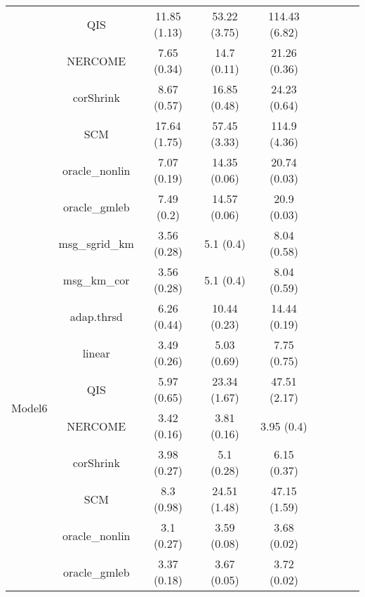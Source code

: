 \documentclass[useAMS,referee,usenatbib]{biom}
\begin{document}
\begin{table}[H]
{\begin{tabular}{ccccccccc}
 & QIS            & 11.85 (1.13) & 53.22 (3.75) & 114.43 (6.82) \\
 & NERCOME        & 7.65 (0.34)  & 14.7 (0.11)  & 21.26 (0.36)  \\
 & corShrink      & 8.67 (0.57)  & 16.85 (0.48) & 24.23 (0.64)  \\
 & SCM            & 17.64 (1.75) & 57.45 (3.33) & 114.9 (4.36)  \\
 & oracle\_nonlin & 7.07 (0.19)  & 14.35 (0.06) & 20.74 (0.03)  \\
 & oracle\_gmleb  & 7.49 (0.2)   & 14.57 (0.06) & 20.9 (0.03)   \\  \midrule
\multirow{10}{*}{Model6}  
 & msg\_sgrid\_km & 3.56 (0.28) & 5.1 (0.4)    & 8.04 (0.58)  \\
 & msg\_km\_cor   & 3.56 (0.28) & 5.1 (0.4)    & 8.04 (0.59)  \\
 & adap.thrsd     & 6.26 (0.44) & 10.44 (0.23) & 14.44 (0.19) \\
 & linear         & 3.49 (0.26) & 5.03 (0.69)  & 7.75 (0.75)  \\
 & QIS            & 5.97 (0.65) & 23.34 (1.67) & 47.51 (2.17) \\
 & NERCOME        & 3.42 (0.16) & 3.81 (0.16)  & 3.95 (0.4)   \\
 & corShrink      & 3.98 (0.27) & 5.1 (0.28)   & 6.15 (0.37)  \\
 & SCM            & 8.3 (0.98)  & 24.51 (1.48) & 47.15 (1.59) \\
 & oracle\_nonlin & 3.1 (0.27)  & 3.59 (0.08)  & 3.68 (0.02)  \\
 & oracle\_gmleb  & 3.37 (0.18) & 3.67 (0.05)  & 3.72 (0.02) \\ \bottomrule
\end{tabular}%
}
\end{table}
\end{document}
